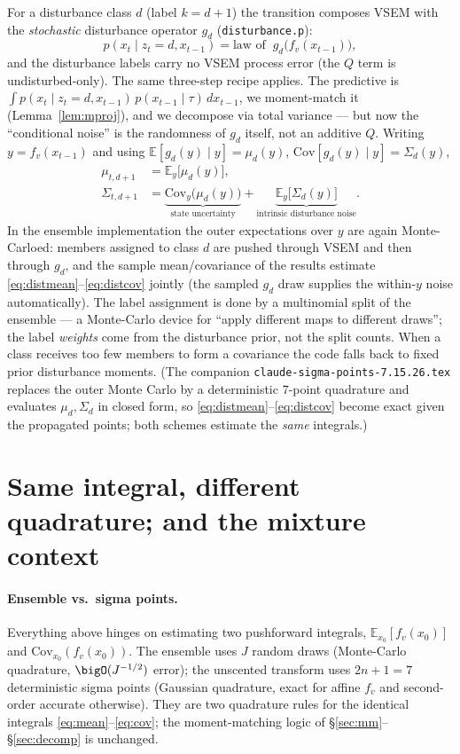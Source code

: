 \documentclass[11pt]{article}
\newcommand{\code}[1]{\texttt{#1}}
\newcommand{\E}{\mathbb{E}}
\newcommand{\Cov}{\mathrm{Cov}}
\begin{document}
For a disturbance class $d$ (label $k=d+1$) the transition composes VSEM with the
\emph{stochastic} disturbance operator $g_d$ (\code{disturbance.p}):
\begin{equation}
\label{eq:disttrans}
p(x_t\mid z_t{=}d,x_{t-1})=\text{law of }\ g_d\!\big(f_v(x_{t-1})\big),
\end{equation}
and the disturbance labels carry no VSEM process error (the $Q$ term is undisturbed-only).
The same three-step recipe applies. The predictive is
$\int \! p(x_t\mid z_t{=}d,x_{t-1})\,p(x_{t-1}\mid\tau)\,dx_{t-1}$, we moment-match it
(Lemma~\ref{lem:mproj}), and we decompose via total variance --- but now the ``conditional
noise'' is the randomness of $g_d$ itself, not an additive $Q$. Writing $y=f_v(x_{t-1})$
and using $\E[g_d(y)\mid y]=\mu_d(y)$, $\Cov[g_d(y)\mid y]=\Sigma_d(y)$,
\begin{align}
\mu_{t,d+1}&=\E_{y}\big[\mu_d(y)\big],\label{eq:distmean}\\
\Sigma_{t,d+1}&=\underbrace{\Cov_{y}\!\big(\mu_d(y)\big)}_{\text{state uncertainty}}
              +\underbrace{\E_{y}\!\big[\Sigma_d(y)\big]}_{\text{intrinsic disturbance noise}} .
\label{eq:distcov}
\end{align}
In the ensemble implementation the outer expectations over $y$ are again Monte-Carloed:
members assigned to class $d$ are pushed through VSEM and then through $g_d$, and the
sample mean/covariance of the results estimate \eqref{eq:distmean}--\eqref{eq:distcov}
jointly (the sampled $g_d$ draw supplies the within-$y$ noise automatically). The label
assignment is done by a multinomial split of the ensemble --- a Monte-Carlo device for
``apply different maps to different draws''; the label \emph{weights} come from the
disturbance prior, not the split counts. When a class receives too few members to form a
covariance the code falls back to fixed prior disturbance moments.
(The companion \code{claude-sigma-points-7.15.26.tex} replaces the outer Monte Carlo by a
deterministic $7$-point quadrature and evaluates $\mu_d,\Sigma_d$ in closed form, so
\eqref{eq:distmean}--\eqref{eq:distcov} become exact given the propagated points; both
schemes estimate the \emph{same} integrals.)

\section{Same integral, different quadrature; and the mixture context}
\label{sec:context}

\paragraph{Ensemble vs.\ sigma points.} Everything above hinges on estimating two
pushforward integrals, $\E_{x_0}[f_v(x_0)]$ and $\Cov_{x_0}(f_v(x_0))$. The ensemble uses
$J$ random draws (Monte-Carlo quadrature, $\bigO(J^{-1/2})$ error); the unscented
transform uses $2n+1=7$ deterministic sigma points (Gaussian quadrature, exact for affine
$f_v$ and second-order accurate otherwise). They are two quadrature rules for the
identical integrals \eqref{eq:mean}--\eqref{eq:cov}; the moment-matching logic of
\S\ref{sec:mm}--\S\ref{sec:decomp} is unchanged.
\end{document}

